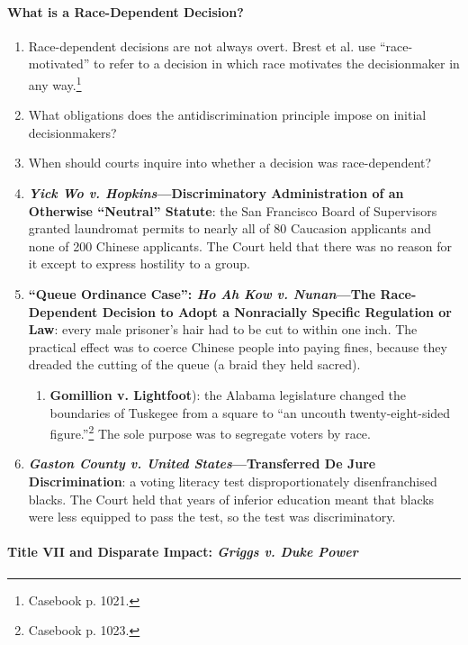 \paragraph{What is a Race-Dependent Decision?}

\begin{enumerate}
    \item Race-dependent decisions are not always overt. Brest et al. use 
    ``race-motivated'' to refer to a decision in which race motivates the 
    decisionmaker in any way.\footnote{Casebook p. 1021.}
    \item What obligations does the antidiscrimination principle impose on 
    initial decisionmakers?
    \item When should courts inquire into whether a decision was 
    race-dependent?
    \item \textbf{\emph{Yick Wo v. Hopkins}---Discriminatory Administration of 
    an Otherwise ``Neutral'' Statute}: the San Francisco Board of Supervisors 
    granted laundromat permits to nearly all of 80 Caucasion applicants and 
    none of 200 Chinese applicants. The Court held that there was no reason 
    for it except to express hostility to a group.
    \item \textbf{``Queue Ordinance Case'': \emph{Ho Ah Kow v. Nunan}---The 
    Race-Dependent Decision to Adopt a Nonracially Specific Regulation or 
    Law}: every male prisoner's hair had to be cut to within one inch. The 
    practical effect was to coerce Chinese people into paying fines, because 
    they dreaded the cutting of the queue (a braid they held sacred).
    \begin{enumerate}
        \item \textbf{Gomillion v. Lightfoot}): the Alabama legislature 
        changed the boundaries of Tuskegee from a square to ``an uncouth 
        twenty-eight-sided figure.''\footnote{Casebook p. 1023.} The sole 
        purpose was to segregate voters by race.
    \end{enumerate}
    \item \textbf{\emph{Gaston County v. United States}---Transferred De Jure 
    Discrimination}: a voting literacy test disproportionately disenfranchised 
    blacks. The Court held that years of inferior education meant that blacks 
    were less equipped to pass the test, so the test was discriminatory.
\end{enumerate}
 
\paragraph{Title VII and Disparate Impact: \emph{Griggs v. Duke Power}}

